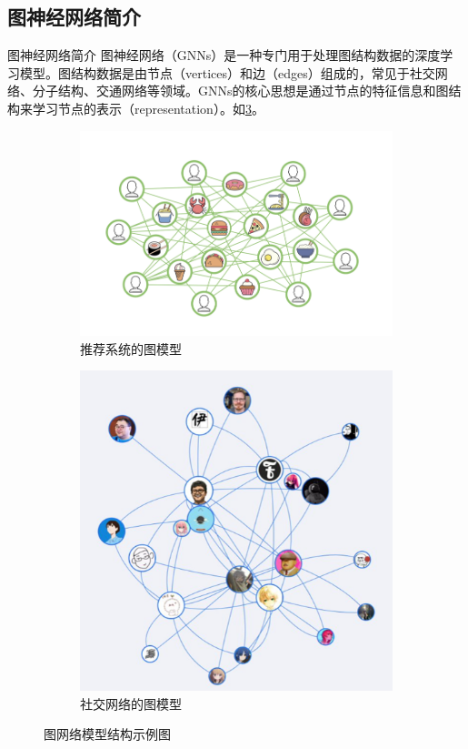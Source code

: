 \documentclass[UTF8, aspectratio=169,10pt]{beamer}%
\numberwithin{equation}{section}
\numberwithin{figure}{section}
\numberwithin{table}{section}
\theoremstyle{definition}
\begin{document}
\subsection{图神经网络简介}
\begin{frame}{图神经网络简介}
	图神经网络（GNNs）是一种专门用于处理图结构数据的深度学习模型。图结构数据是由节点（vertices）和边（edges）组成的，常见于社交网络、分子结构、交通网络等领域。GNNs的核心思想是通过节点的特征信息和图结构来学习节点的表示（representation）。如\cref{fig:c1}。
\begin{figure}
	\centering
	\begin{subfigure}[b]{0.4\linewidth}
		\centering
		\includegraphics[width=\linewidth]{fig/w1}
		\caption{推荐系统的图模型}
		\label{fig:1}
	\end{subfigure}
\hspace{0.05\linewidth} %
	\begin{subfigure}[b]{0.3\linewidth}
		\centering
		\includegraphics[width=\linewidth]{fig/w2}
		\caption{社交网络的图模型}
		\label{fig:2}
	\end{subfigure}
	\caption{图网络模型结构示例图}
	\label{fig:c1}
\end{figure}

	
\end{frame}
\end{document}

